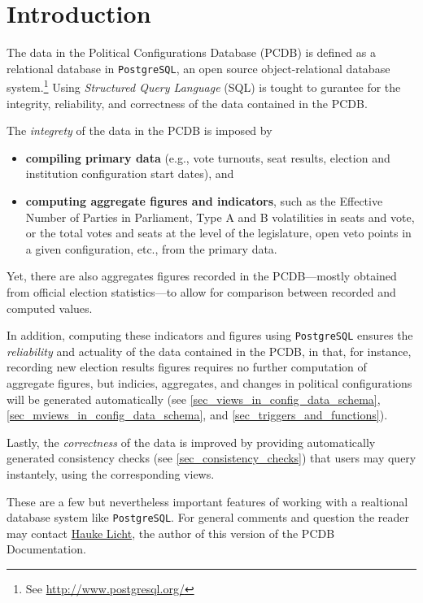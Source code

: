 \chapter{Introduction}\label{chap_introduction}

The data in the Political Configurations Database (PCDB) is defined as a relational database in \texttt{PostgreSQL}, an open source object-relational database system.\footnote{See \url{http://www.postgresql.org/}} 
Using \emph{Structured Query Language} (SQL) is tought to gurantee for the integrity, reliability, and correctness of the data contained in the PCDB.

The \emph{integrety} of the data in the PCDB is imposed by 
\begin{itemize}
\item[]\textbf{compiling primary data} (e.g., vote turnouts, seat results, election and institution configuration start dates), and 
\item[]\textbf{computing aggregate figures and indicators}, such as the Effective Number of Parties in Parliament, Type A and B volatilities in seats and vote, or the total votes and seats at the level of the legislature, open veto points in a given configuration, etc., from the primary data.
\end{itemize}
Yet, there are also aggregates figures recorded in the PCDB---mostly obtained from official election statistics---to allow for comparison between recorded and computed values.

In addition, computing these indicators and figures using \texttt{PostgreSQL} ensures the \emph{reliability} and actuality of the data contained in the PCDB, in that, for instance, recording new election results figures requires no further computation of aggregate figures, but indicies, aggregates, and changes in political configurations will be generated automatically (see \ref{sec_views_in_config_data_schema}, \ref{sec_mviews_in_config_data_schema}, and \ref{sec_triggers_and_functions}).

Lastly, the \emph{correctness} of the data is improved by providing automatically generated consistency checks (see \ref{sec_consistency_checks}) that users may query instantely, using the corresponding views. 

These are a few but nevertheless important features of working with a realtional database system like \texttt{PostgreSQL}. %
For general comments and question the reader may contact \href{mailto:hauke.licht.1@hu-berlin.de}{Hauke Licht}, the author of this version of the PCDB Documentation.
